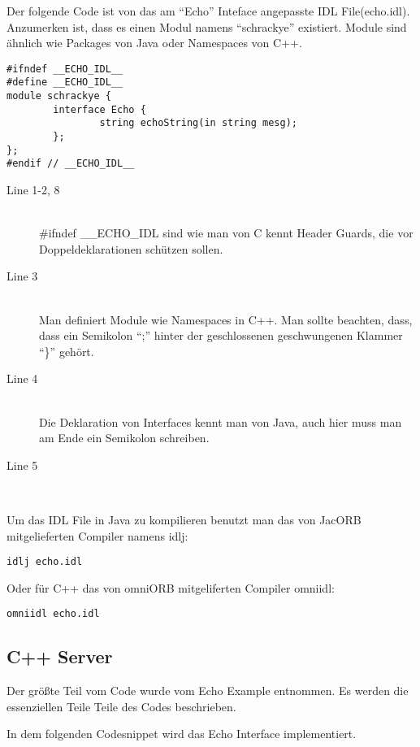 \documentclass[11pt]{article}
\begin{document}
Der folgende Code ist von das am ``Echo'' Inteface angepasste IDL File(echo.idl). Anzumerken ist, dass es einen Modul namens ``schrackye'' existiert. Module sind ähnlich wie Packages von Java oder Namespaces von C++. 

\lstset{language=IDL}  

\begin{lstlisting}
#ifndef __ECHO_IDL__
#define __ECHO_IDL__
module schrackye {
        interface Echo {
                string echoString(in string mesg);
        };
};
#endif // __ECHO_IDL__         

\end{lstlisting}

\begin{description}
\item[Line 1-2, 8] \hfill \\
\#ifndef \_\_ECHO\_IDL sind wie man von C kennt Header Guards, die vor Doppeldeklarationen schützen sollen. 
\item[Line 3] \hfill \\
Man definiert Module wie Namespaces in C++. Man sollte beachten, dass, dass ein Semikolon ``;'' hinter der geschlossenen geschwungenen Klammer ``\}'' gehört.
\item[Line 4] \hfill \\
Die Deklaration von Interfaces kennt man von Java, auch hier muss man am Ende ein Semikolon schreiben.
\item[Line 5] \hfill \\


\end{description}
Um das IDL File in Java zu kompilieren benutzt man das von JacORB mitgelieferten Compiler namens idlj:
\lstset{language=bash}
\begin{lstlisting}
idlj echo.idl
\end{lstlisting}
Oder für C++ das von omniORB mitgeliferten Compiler omniidl:
\begin{lstlisting}
omniidl echo.idl
\end{lstlisting}

\subsection{C++ Server}

Der größte Teil vom Code wurde vom Echo Example entnommen. Es werden die essenziellen Teile Teile des Codes beschrieben. 

In dem folgenden Codesnippet wird das Echo Interface implementiert.
\end{document}
